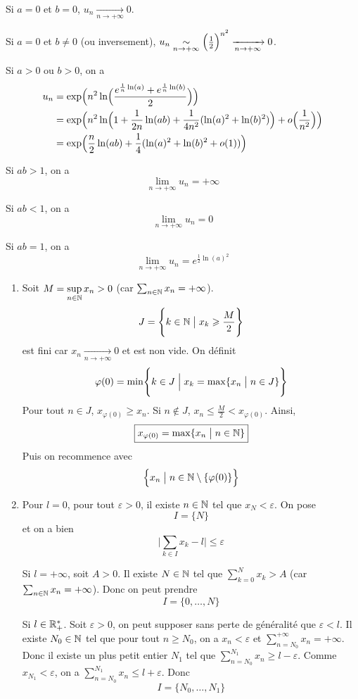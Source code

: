 \begin{solution}
	Si $a=0$ et $b=0$, $u_{n}\xrightarrow[n\to+\infty]{}0$.

	Si $a=0$ et $b\neq0$ (ou inversement), $u_{n}\underset{n\to+\infty}{\sim}\Bigl(\frac{1}{2}\Bigr)^{n^{2}}\xrightarrow[n\to+\infty]{}0$.

	Si $a>0$ ou $b>0$, on a
	\begin{align*}
		u_{n}
		&=\exp\Bigl(n^{2}\ln\Bigl(\frac{e^{\frac{1}{n}\ln(a)}+e^{\frac{1}{n}\ln(b)}}{2}\Bigr)\Bigr)\\
		&=\exp\Bigl(n^{2}\ln\Bigl(1+\frac{1}{2n}\ln(ab)+\frac{1}{4n^2}(\ln(a)^{2}+\ln(b)^{2})\Bigr)+o\Bigl(\frac{1}{n^{2}}\Bigr)\Bigr)\\
		&=\exp\Bigl(\frac{n}{2}\ln(ab)+\frac{1}{4}(\ln(a)^{2}+\ln(b)^{2}+o(1))\Bigr)
	\end{align*}

	Si $ab>1$, on a 
	$$\boxed{\lim\limits_{n\to+\infty} u_{n}=+\infty}$$
	
	Si $ab<1$, on a 
	$$\boxed{\lim\limits_{n\to+\infty} u_{n}=0}$$

	Si $ab=1$, on a 
	$$\boxed{\lim\limits_{n\to+\infty} u_{n}=e^{\frac{1}{2}\ln(a)^{2}}}$$
\end{solution}

\begin{solution}
	\phantom{}
	\begin{enumerate}
		\item Soit $M=\sup\limits_{n\in\mathbb{N}}x_{n}>0$ (car $\sum_{n\in\mathbb{N}}x_{n}=+\infty$). 
		$$J=\Biggl\{k\in\mathbb{N}\bigm| x_{k}\geqslant\frac{M}{2}\Biggr\}$$
		est fini car $x_{n}\xrightarrow[n\to+\infty]{}0$ et est non vide. On définit 
		$$\varphi(0)=\min\Biggl\{k\in J\Bigm| x_{k}=\max\{x_{n}\bigm|n\in J\}\Biggr\}$$
		Pour tout $n\in J$, $x_{\varphi(0)}\geqslant x_{n}$. Si $n\notin J$, $x_{n}\leqslant\frac{M}{2}<x_{\varphi(0)}$. Ainsi, 
		$$\boxed{x_{\varphi(0)}=\max\{x_{n}\bigm| n\in\mathbb{N}\}}$$
		Puis on recommence avec 
		$$\Bigl\{x_{n}\bigm| n\in\mathbb{N}\setminus\{\varphi(0)\}\Bigr\}$$

		\item Pour $l=0$, pour tout $\varepsilon>0$, il existe $n\in\mathbb{N}$ tel que $x_{N}<\varepsilon$. On pose 
		$$\boxed{I=\{N\}}$$
		et on a bien 
		$$\Biggl\lvert\sum_{k\in I}x_{k}-l\Biggr\rvert\leqslant\varepsilon$$

		Si $l=+\infty$, soit $A>0$. Il existe $N\in\mathbb{N}$ tel que $\sum_{k=0}^{N}x_{k}>A$ (car $\sum_{n\in\mathbb{N}}x_{n}=+\infty$). Donc on peut prendre 
		$$\boxed{I=\{0,\dots,N\}}$$

		Si $l\in\mathbb{R}_{+}^{*}$. Soit $\varepsilon>0$, on peut supposer sans perte de généralité que $\varepsilon<l$. Il existe $N_{0}\in\mathbb{N}$ tel que pour tout $n\geqslant N_{0}$, on a $x_{n}<\varepsilon$ et $\sum_{n=N_{0}}^{+\infty}x_{n}=+\infty$. Donc il existe un plus petit entier $N_{1}$ tel que $\sum_{n=N_{0}}^{N_{1}}x_{n}\geqslant l-\varepsilon$. Comme $x_{N_{1}}<\varepsilon$, on a $\sum_{n=N_{0}}^{N_{1}}x_{n}\leqslant l+\varepsilon$. Donc 
		$$\boxed{I=\{N_{0},\dots,N_{1}\}}$$
	\end{enumerate}
\end{solution}

